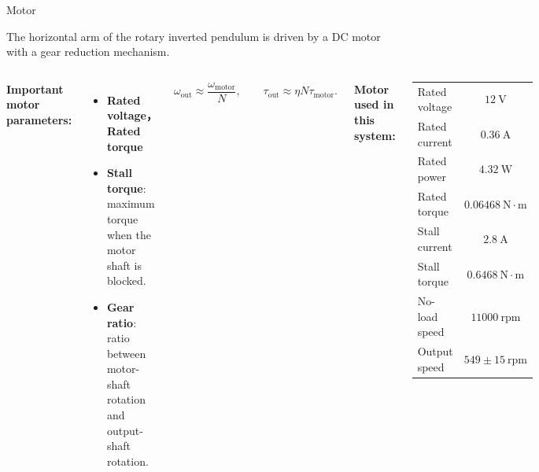 \documentclass[aspectratio=169]{beamer}
\begin{document}
\begin{frame}{Motor}

The horizontal arm of the rotary inverted pendulum is driven by a DC motor with a gear reduction mechanism.



\begin{columns}[T]

\textbf{Important motor parameters:}

\begin{itemize}
    \item \textbf{Rated voltage，Rated torque}

    \item \textbf{Stall torque}: maximum torque when the motor shaft is blocked.
    \item \textbf{Gear ratio}: ratio between motor-shaft rotation and output-shaft rotation.
\end{itemize}

\[
\omega_{\mathrm{out}} \approx \frac{\omega_{\mathrm{motor}}}{N},
\qquad
\tau_{\mathrm{out}} \approx \eta N\tau_{\mathrm{motor}} .
\]


\textbf{Motor used in this system:}

\vspace{0.1cm}

\begin{center}
\begin{tabular}{l c}
\hline
Rated voltage & $12~\mathrm{V}$ \\
Rated current & $0.36~\mathrm{A}$ \\
Rated power & $4.32~\mathrm{W}$ \\
Rated torque & $0.06468~\mathrm{N\cdot m}$ \\
Stall current & $2.8~\mathrm{A}$ \\
Stall torque & $0.6468~\mathrm{N\cdot m}$ \\
No-load speed & $11000~\mathrm{rpm}$ \\
Output speed & $549\pm15~\mathrm{rpm}$ \\
\hline
\end{tabular}
\end{center}

\end{columns}
\end{frame}
\end{document}
